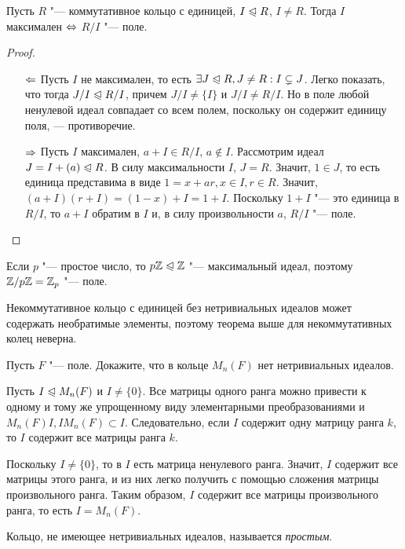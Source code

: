 \begin{theorem}
	Пусть $R$ "--- коммутативное кольцо с единицей, $I \hm\normal R$, $I \ne R$. Тогда $I$ максимален $\Leftrightarrow$ $R / I$ "--- поле.
\end{theorem}

\begin{proof}~
	\begin{itemize}
		\item[$\Leftarrow$] Пусть $I$ не максимален, то есть $\exists J \trianglelefteqslant R, J \ne R: I \subsetneq J$. Легко показать, что тогда $J / I \trianglelefteqslant R / I$, причем $J / I \ne \{I\}$ и $J / I \ne R / I$. Но в поле любой ненулевой идеал совпадает со всем полем, поскольку он содержит единицу поля, --- противоречие.
		\item[$\Rightarrow$] Пусть $I$ максимален, $a + I \in R / I$, $a \not\in I$. Рассмотрим идеал $J = I + (a) \trianglelefteqslant R$. В силу максимальности $I$, $J = R$. Значит, $1 \in J$, то есть единица представима в виде $1 = x + ar, x \in I, r \in R$. Значит, $(a + I)(r + I) = (1 - x) + I = 1 + I$. Поскольку $1 + I$ "--- это единица в $R / I$, то $a + I$ обратим в $I$ и, в силу произвольности $a$, $R / I$ "--- поле.
	\end{itemize}
\end{proof}

\begin{note}
	Если $p$ "--- простое число, то $p\mathbb{Z} \trianglelefteqslant \mathbb{Z}$ "--- максимальный идеал, поэтому $\Z / p\Z \hm= \Z_p$ "--- поле.
\end{note}

\begin{note}
	Некоммутативное кольцо с единицей без нетривиальных идеалов может содержать необратимые элементы, поэтому теорема выше для некоммутативных колец неверна.
\end{note}

\begin{exercise}
	Пусть $F$ "--- поле. Докажите, что в кольце $M_n(F)$ нет нетривиальных идеалов.
\end{exercise}

\begin{solution}
	Пусть $I \trianglelefteqslant M_n(F)$ и $I \ne \{0\}$. Все матрицы одного ранга можно привести к одному и тому же упрощенному виду элементарными преобразованиями и $M_n(F)I, IM_n(F) \subset I$. Следовательно, если $I$ содержит одну матрицу ранга $k$, то $I$ содержит все матрицы ранга $k$.
	
	Поскольку $I \ne \{0\}$, то в $I$ есть матрица ненулевого ранга. Значит, $I$ содержит все матрицы этого ранга, и из них легко получить с помощью сложения матрицы произвольного ранга. Таким образом, $I$ содержит все матрицы произвольного ранга, то есть $I = M_n(F)$.
\end{solution}

\begin{definition}
	Кольцо, не имеющее нетривиальных идеалов, называется \textit{простым}.
\end{definition}